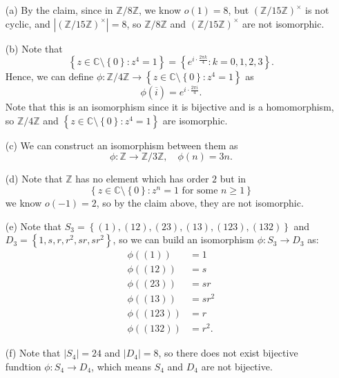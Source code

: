 \documentclass[12pt]{article}
\begin{document}
\begin{enumerate}
    \begin{itemize}
        \item [(a)] By the claim, since in \(\mathbb{Z} / 8 \mathbb{Z} \), we know \(o(1) = 8 \), but \(\left( \mathbb{Z} / 15 \mathbb{Z}  \right)^{\times } \) is not cyclic, and \(\left\vert \left( \mathbb{Z} / 15 \mathbb{Z}  \right)^{\times }  \right\vert = 8\), so \(\mathbb{Z} / 8\mathbb{Z} \) and \(\left( \mathbb{Z} / 15 \mathbb{Z}  \right)^{\times } \) are not isomorphic.   
        \item [(b)] Note that 
        \[
            \left\{ z \in \mathbb{C} \setminus \left\{ 0 \right\} : z^4 = 1 \right\} = \left\{ e^{i \cdot \frac{2 \pi k}{4}}: k = 0, 1, 2, 3 \right\}.  
        \]
        Hence, we can define \(\phi : \mathbb{Z} / 4 \mathbb{Z} \to \left\{ z \in \mathbb{C} \setminus \left\{ 0 \right\}: z^4 = 1  \right\} \) as 
        \[
            \phi \left( \overline{i} \right)  = e^{i \cdot \frac{2 \pi i}{4}}.
        \]
        Note that this is an isomorphism since it is bijective and is a homomorphism, so \(\mathbb{Z} / 4\mathbb{Z} \) and \(\left\{ z \in \mathbb{C} \setminus \left\{ 0 \right\}: z^4 = 1 \right\} \) are isomorphic. 
        \item [(c)] We can construct an isomorphism between them as 
        \[
            \phi : \mathbb{Z} \to \mathbb{Z} / 3 \mathbb{Z},  \quad \phi (n) = 3n.
        \]
        \item [(d)] Note that \(\mathbb{Z} \) has no element which has order \(2\) but in 
        \[
            \left\{ z \in \mathbb{C} \setminus \left\{ 0 \right\} : z^n = 1 \text{ for some } n \ge 1 \right\}
        \] we know \(o(-1) = 2\), so by the claim above, they are not isomorphic. 
        \item [(e)] Note that 
        \(
            S_3 = \left\{ (1), (12), (23), (13), (123), (132) \right\} 
        \) and 
        \(
            D_3 = \left\{ 1, s, r, r^2, sr, sr^2 \right\} 
        \), so we can build an isomorphism \(\phi:S_3 \to D_3 \) as:
        \begin{align*}
            \phi ((1)) &= 1 \\
            \phi ((12)) &= s \\
            \phi ((23)) &= sr \\
            \phi ((13)) &= sr^2 \\
            \phi ((123)) &= r \\
            \phi ((132)) &= r^2.
        \end{align*}
        \item [(f)] Note that \(\left\vert S_4 \right\vert = 24 \) and \(\left\vert D_4 \right\vert = 8 \), so there does not exist bijective fundtion \(\phi : S_4 \to D_4\), which means \(S_4\) and \(D_4\) are not bijective.   

\end{itemize}
\end{enumerate}
\end{document}
